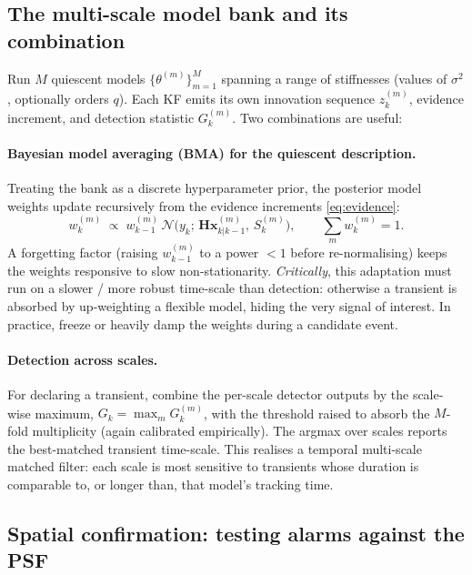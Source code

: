 \documentclass[11pt]{article}
\newcommand{\Norm}{\mathcal{N}}
\begin{document}
\subsection{The multi-scale model bank and its combination}
\label{sec:bank}

Run $M$ quiescent models $\{\theta^{(m)}\}_{m=1}^{M}$ spanning a range of stiffnesses
(values of $\sigma^2$, optionally orders $q$). Each KF emits its own innovation
sequence $z_k^{(m)}$, evidence increment, and detection statistic $G_k^{(m)}$. Two
combinations are useful:

\paragraph{Bayesian model averaging (BMA) for the quiescent description.}
Treating the bank as a discrete hyperparameter prior, the posterior model weights
update recursively from the evidence increments \eqref{eq:evidence}:
\begin{equation}
  w_k^{(m)} \;\propto\; w_{k-1}^{(m)}\,
  \Norm\!\big(y_k;\,\bm{H}\bm{x}^{(m)}_{k|k-1},\,S_k^{(m)}\big),
  \qquad \sum_m w_k^{(m)}=1 .
\end{equation}
A forgetting factor (raising $w_{k-1}^{(m)}$ to a power $<1$ before re-normalising)
keeps the weights responsive to slow non-stationarity. \emph{Critically}, this
adaptation must run on a slower / more robust time-scale than detection: otherwise a
transient is absorbed by up-weighting a flexible model, hiding the very signal of
interest. In practice, freeze or heavily damp the weights during a candidate event.

\paragraph{Detection across scales.}
For declaring a transient, combine the per-scale detector outputs by the scale-wise
maximum, $G_k=\max_m G_k^{(m)}$, with the threshold raised to absorb the $M$-fold
multiplicity (again calibrated empirically). The argmax over scales reports the
best-matched transient time-scale. This realises a temporal multi-scale matched
filter: each scale is most sensitive to transients whose duration is comparable to,
or longer than, that model's tracking time.

\subsection{Spatial confirmation: testing alarms against the PSF}
\label{sec:spatial}
\end{document}
